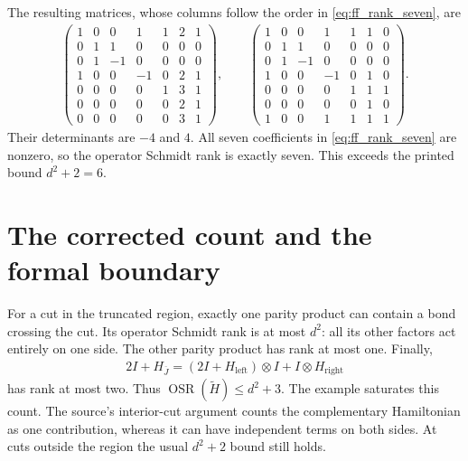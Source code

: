 \documentclass{article}
\begin{document}
The resulting matrices, whose columns follow the order in
\eqref{eq:ff_rank_seven}, are
\begin{align}
 \begin{pmatrix}
 1&0&0&1&1&2&1\\0&1&1&0&0&0&0\\0&1&-1&0&0&0&0\\
 1&0&0&-1&0&2&1\\0&0&0&0&1&3&1\\0&0&0&0&0&2&1\\0&0&0&0&0&3&1
 \end{pmatrix},\qquad
 \begin{pmatrix}
 1&0&0&1&1&1&0\\0&1&1&0&0&0&0\\0&1&-1&0&0&0&0\\
 1&0&0&-1&0&1&0\\0&0&0&0&1&1&1\\0&0&0&0&0&1&0\\1&0&0&1&1&1&1
 \end{pmatrix}.
    \label{eq:ff_rank_selected_matrices}
\end{align}
Their determinants are $-4$ and $4$. All seven coefficients in
\eqref{eq:ff_rank_seven} are nonzero, so the operator Schmidt rank
is exactly seven. This exceeds the printed bound $d^2+2=6$.

\section{The corrected count and the formal boundary}

For a cut in the truncated region, exactly one parity product can contain
a bond crossing the cut. Its operator Schmidt rank is at most $d^2$:
all its other factors act entirely on one side. The other parity product
has rank at most one. Finally,
\begin{align}
 2I+H_{\overline J}= (2I+H_{\mathrm{left}})\otimes I
                         +I\otimes H_{\mathrm{right}}
    \label{eq:ff_rank_complement_split}
\end{align}
has rank at most two. Thus $\operatorname{OSR}(\widetilde H)\le d^2+3$.
The example saturates this count. The source's interior-cut argument
counts the complementary Hamiltonian as one contribution, whereas it can
have independent terms on both sides. At cuts outside the region the
usual $d^2+2$ bound still holds.
\end{document}
